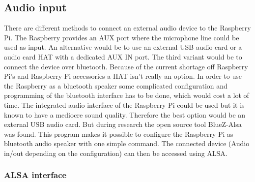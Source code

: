 \subsection{Audio input}\label{sec:software:rec}
%
There are different methods to connect an external audio device to the Raspberry Pi. The Raspberry provides an AUX port where the microphone line could be used as input. An alternative would be to use an external USB audio card or a audio card HAT with a dedicated AUX IN port. The third variant would be to connect the device over bluetooth.\p
%
Because of the current shortage off Raspberry Pi's and Raspberry Pi accessories a HAT isn't really an option. In order to use the Raspberry as a bluetooth speaker some complicated configuration and programming of the bluetooth interface has to be done, which would cost a lot of time. The integrated audio interface of the Raspberry Pi could be used but it is known to have a mediocre sound quality. Therefore the best option would be an external USB audio card. But during research the open source tool BlueZ-Alsa\cite{bokowy_bluez-alsa_2022} was found. This program makes it possible to configure the Raspberry Pi as bluetooth audio speaker with one simple command. The connected device (Audio in/out depending on the configuration) can then be accessed using ALSA.
%
\subsubsection*{ALSA interface}

